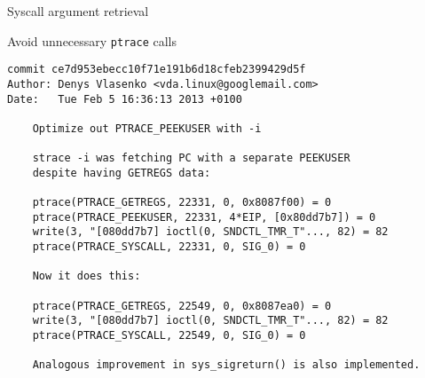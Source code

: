 \documentclass[unicode,aspectratio=169]{beamer}
\begin{document}
\begin{frame}[fragile]{Syscall argument retrieval}
\begin{block}{\large Avoid unnecessary \texttt{ptrace} calls}
\begin{scriptsize}
\begin{verbatim}
commit ce7d953ebecc10f71e191b6d18cfeb2399429d5f
Author: Denys Vlasenko <vda.linux@googlemail.com>
Date:   Tue Feb 5 16:36:13 2013 +0100

    Optimize out PTRACE_PEEKUSER with -i
    
    strace -i was fetching PC with a separate PEEKUSER
    despite having GETREGS data:
    
    ptrace(PTRACE_GETREGS, 22331, 0, 0x8087f00) = 0
    ptrace(PTRACE_PEEKUSER, 22331, 4*EIP, [0x80dd7b7]) = 0
    write(3, "[080dd7b7] ioctl(0, SNDCTL_TMR_T"..., 82) = 82
    ptrace(PTRACE_SYSCALL, 22331, 0, SIG_0) = 0
    
    Now it does this:
    
    ptrace(PTRACE_GETREGS, 22549, 0, 0x8087ea0) = 0
    write(3, "[080dd7b7] ioctl(0, SNDCTL_TMR_T"..., 82) = 82
    ptrace(PTRACE_SYSCALL, 22549, 0, SIG_0) = 0
    
    Analogous improvement in sys_sigreturn() is also implemented.
\end{verbatim}
\end{scriptsize}
\end{block}
\end{frame}
\end{document}
